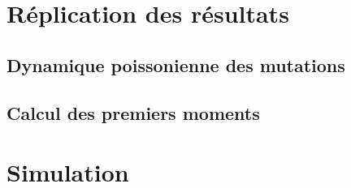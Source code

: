 \documentclass[12pt]{article}
\begin{document}
\newpage

\appendix

\section{Réplication des résultats}

\subsection{Dynamique poissonienne des mutations}

\subsection{Calcul des premiers moments}


\newpage

\section{Simulation}
\end{document}
